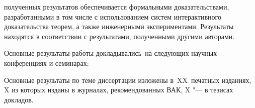 {\reliability} полученных результатов обеспечивается 
формальными доказательствами, разработанными в том числе с использованием
систем интерактивного доказательства теорем, 
а также инженерными экспериментами. 
Результаты находятся в соответствии с результатами, полученными другими авторами.

{\probation}
Основные результаты работы докладывались~на
следующих научных конференциях и семинарах:


{%
    {\publications} Основные результаты по теме диссертации изложены
    в~XX~печатных изданиях,
    X из которых изданы в журналах, рекомендованных ВАК,
    X "--- в тезисах докладов.
}%
